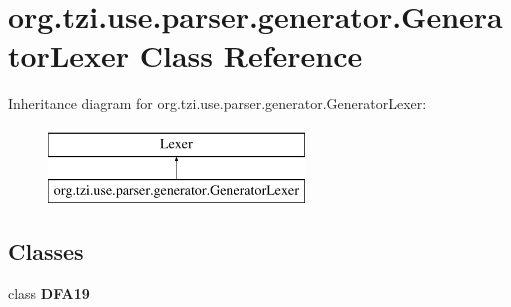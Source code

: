 \hypertarget{classorg_1_1tzi_1_1use_1_1parser_1_1generator_1_1_generator_lexer}{\section{org.\-tzi.\-use.\-parser.\-generator.\-Generator\-Lexer Class Reference}
\label{classorg_1_1tzi_1_1use_1_1parser_1_1generator_1_1_generator_lexer}
}
Inheritance diagram for org.\-tzi.\-use.\-parser.\-generator.\-Generator\-Lexer\-:\begin{figure}[H]
\begin{center}
\leavevmode
\includegraphics[height=2.000000cm]{classorg_1_1tzi_1_1use_1_1parser_1_1generator_1_1_generator_lexer}
\end{center}
\end{figure}
\subsection*{Classes}
\begin{DoxyCompactItemize}
\item 
class {\bfseries D\-F\-A19}
\end{DoxyCompactItemize}
